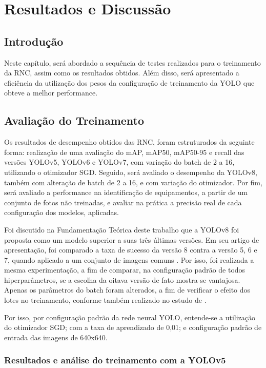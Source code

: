 \chapter{Resultados e Discussão}

\section{Introdução} 

Neste capítulo, será abordado a sequência de testes realizados para o treinamento da RNC, assim como os resultados obtidos. Além disso, será apresentado a eficiência da utilização dos pesos da configuração de treinamento da YOLO que obteve a melhor performance. 

\section{Avaliação do Treinamento} 

Os resultados de desempenho obtidos das RNC, foram estruturados da seguinte forma: realização de uma avaliação do mAP, mAP50, mAP50-95 e recall das versões YOLOv5, YOLOv6 e YOLOv7, com variação do batch de 2 a 16, utilizando o otimizador SGD. Seguido, será avaliado o desempenho da YOLOv8, também com alteração de batch de 2 a 16, e com variação do otimizador. Por fim, será avaliado a performance na identificação de equipamentos, a partir de um conjunto de fotos não treinadas, e avaliar na prática a precisão real de cada configuração dos modelos, aplicadas. 

Foi discutido na Fundamentação Teórica deste trabalho que a YOLOv8 foi proposta como um modelo superior a suas três últimas versões. Em seu artigo de apresentação, foi comparado a taxa de sucesso da versão 8 contra a versão 5, 6 e 7, quando aplicado a um conjunto de imagens comuns \cite{ultralytics2023yolo}. Por isso, foi realizada a mesma experimentação, a fim de comparar, na configuração padrão de todos hiperparâmetros, se a escolha da oitava versão de fato mostra-se vantajosa. Apenas os parâmetros do batch foram alterados, a fim de verificar o efeito dos lotes no treinamento, conforme também realizado no estudo de \cite{gonzaga2023identificaccao}.

Por isso, por configuração padrão da rede neural YOLO, entende-se a utilização do otimizador SGD; com a taxa de aprendizado de 0,01; e configuração padrão de entrada das imagens de 640x640. 

\subsection{Resultados e análise do treinamento com a YOLOv5}

